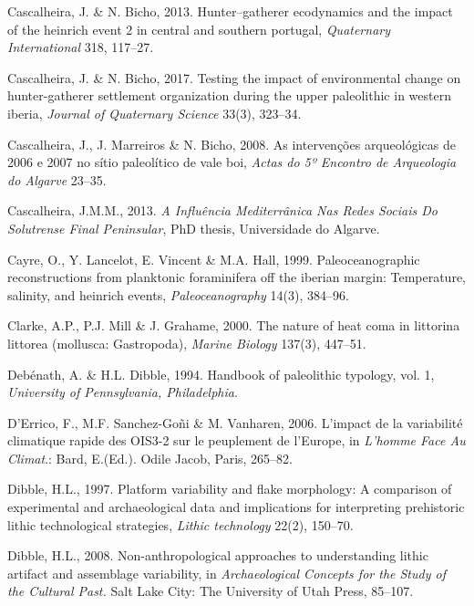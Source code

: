 \documentclass[12pt,twoside]{reedthesis}
\begin{document}
\leavevmode\hypertarget{ref-cascalheiraandbicho2013}{}%
Cascalheira, J. \& N. Bicho, 2013. Hunter--gatherer ecodynamics and the impact of the heinrich event 2 in central and southern portugal, \emph{Quaternary International} 318, 117--27.

\leavevmode\hypertarget{ref-cascalheirabicho2017}{}%
Cascalheira, J. \& N. Bicho, 2017. Testing the impact of environmental change on hunter-gatherer settlement organization during the upper paleolithic in western iberia, \emph{Journal of Quaternary Science} 33(3), 323--34.

\leavevmode\hypertarget{ref-cascalheiraetal2008}{}%
Cascalheira, J., J. Marreiros \& N. Bicho, 2008. As intervenções arqueológicas de 2006 e 2007 no sítio paleolítico de vale boi, \emph{Actas do 5º Encontro de Arqueologia do Algarve} 23--35.

\leavevmode\hypertarget{ref-cascalheira2013}{}%
Cascalheira, J.M.M., 2013. \emph{\textup{A Influência Mediterrânica Nas Redes Sociais Do Solutrense Final Peninsular}}, PhD thesis, Universidade do Algarve.

\leavevmode\hypertarget{ref-cayre1999}{}%
Cayre, O., Y. Lancelot, E. Vincent \& M.A. Hall, 1999. Paleoceanographic reconstructions from planktonic foraminifera off the iberian margin: Temperature, salinity, and heinrich events, \emph{Paleoceanography} 14(3), 384--96.

\leavevmode\hypertarget{ref-clarke2000}{}%
Clarke, A.P., P.J. Mill \& J. Grahame, 2000. The nature of heat coma in littorina littorea (mollusca: Gastropoda), \emph{Marine Biology} 137(3), 447--51.

\leavevmode\hypertarget{ref-debenath1994}{}%
Debénath, A. \& H.L. Dibble, 1994. Handbook of paleolithic typology, vol. 1, \emph{University of Pennsylvania, Philadelphia}.

\leavevmode\hypertarget{ref-derrico2006}{}%
D'Errico, F., M.F. Sanchez-Goñi \& M. Vanharen, 2006. L'impact de la variabilité climatique rapide des OIS3-2 sur le peuplement de l'Europe, in \emph{L'homme Face Au Climat}.: Bard, E.(Ed.). Odile Jacob, Paris, 265--82.

\leavevmode\hypertarget{ref-dibble1997}{}%
Dibble, H.L., 1997. Platform variability and flake morphology: A comparison of experimental and archaeological data and implications for interpreting prehistoric lithic technological strategies, \emph{Lithic technology} 22(2), 150--70.

\leavevmode\hypertarget{ref-dibble2008}{}%
Dibble, H.L., 2008. Non-anthropological approaches to understanding lithic artifact and assemblage variability, in \emph{Archaeological Concepts for the Study of the Cultural Past.} Salt Lake City: The University of Utah Press, 85--107.
\end{document}
